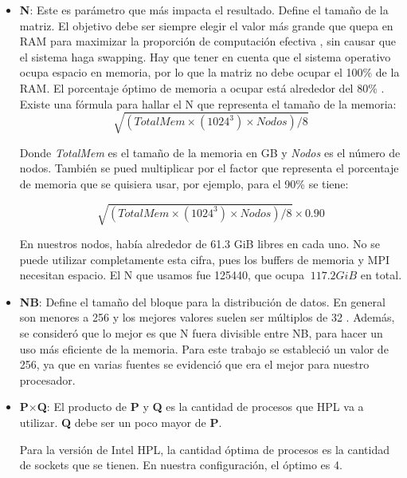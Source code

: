 \documentclass[conference,compsoc]{IEEEtran}
\begin{document}
\begin{itemize}
	\item \textbf{N}: Este es parámetro que más impacta el resultado. Define el tamaño de la matriz. El objetivo debe ser siempre elegir el valor más grande que quepa en RAM para maximizar la proporción de computación efectiva \cite{studentasc}, sin causar que el sistema haga swapping. Hay que tener en cuenta que el sistema operativo ocupa espacio en memoria, por lo que la matriz no debe ocupar el 100\% de la RAM. El porcentaje óptimo de memoria a ocupar está alrededor del 80\% \cite{studentasc}.
	Existe una fórmula para hallar el N que representa el tamaño de la memoria:
    \begin{equation*}
        \sqrt{(TotalMem \times (1024^3) \times Nodos) /8}
    \end{equation*}
    
    Donde \textit{TotalMem} es el tamaño de la memoria en GB y \textit{Nodos} es el número de nodos. También se pued multiplicar por el factor que representa el porcentaje de memoria que se quisiera usar, por ejemplo, para el 90\% se tiene:
    
    \begin{equation*}
        \sqrt{(TotalMem \times (1024^3) \times Nodos) /8} \times 0.90
    \end{equation*}
    
    En nuestros nodos, había alrededor de 61.3 GiB libres en cada uno. No se puede utilizar completamente esta cifra, pues los buffers de memoria y MPI necesitan espacio. El N que usamos fue 125440, que ocupa $~117.2 GiB$ en total.
	
	\item \textbf{NB}: Define el tamaño del bloque para la distribución de datos. En general son menores a 256 y los mejores valores suelen ser múltiplos de 32 \cite{netlib-hpl-faq}. Además, se consideró que lo mejor es que N fuera divisible entre NB, para hacer un uso más eficiente de la memoria. Para este trabajo se estableció un valor de 256, ya que en varias fuentes se evidenció que era el mejor para nuestro procesador.
	
	\item \textbf{P$\times$Q}: El producto de \textbf{P} y \textbf{Q} es la cantidad de procesos que HPL va a utilizar. \textbf{Q} debe ser un poco mayor de \textbf{P}.
	
	Para la versión de Intel HPL, la cantidad óptima de procesos es la cantidad de sockets que se tienen. En nuestra configuración, el óptimo es 4.
	

\end{itemize}
\end{document}
